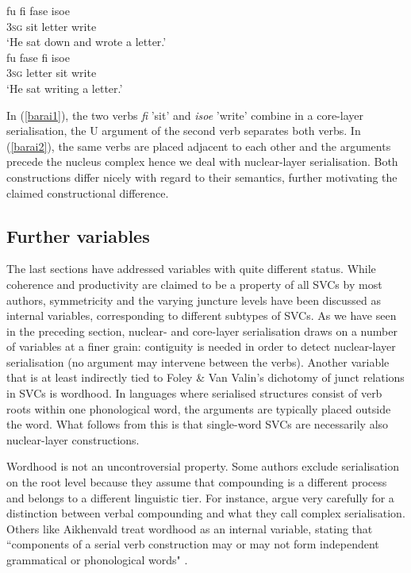 \ea 
{}
\ea \label{barai1}
\gll fu fi fase isoe \\
\textsc{3}\textsc{sg} sit letter write \\
\glft `He sat down and wrote a letter.' \\ 
\ex \label{barai2}
\gll fu fase fi isoe \\ 
\textsc{3}\textsc{sg} letter sit write \\
\glft `He sat writing a letter.'\\ 
\z
\z

In (\ref{barai1}), the two verbs \textit{fi} 'sit' and \textit{isoe} 'write' combine in a core-layer serialisation, the U argument of the second verb separates both verbs. In (\ref{barai2}), the same verbs are placed adjacent to each other and the arguments precede the nucleus complex hence we deal with nuclear-layer serialisation. Both constructions differ nicely with regard to their semantics, further motivating the claimed constructional difference.

\subsection{Further variables}

The last sections have addressed variables with quite different status. While coherence and productivity are claimed to be a property of all SVCs by most authors, symmetricity and the varying juncture levels have been discussed as internal variables, corresponding to different subtypes of SVCs. As we have seen in the preceding section, nuclear- and core-layer serialisation draws on a number of variables at a finer grain: contiguity is needed in order to detect nuclear-layer serialisation (no argument may intervene between the verbs). Another variable that is at least indirectly tied to Foley \& Van Valin's dichotomy of junct relations in SVCs is wordhood. In languages where serialised structures consist of verb roots within one phonological word, the arguments are typically placed outside the word. What follows from this is that single-word SVCs are necessarily also nuclear-layer constructions. 

Wordhood is not an uncontroversial property. Some authors exclude serialisation on the root level because they assume that compounding is a different process and belongs to a different linguistic tier. For instance, \citet[27]{vanstaden2008serial} argue very carefully for a distinction between verbal compounding and what they call complex serialisation. Others like Aikhenvald treat wordhood as an internal variable, stating that ``components of a serial verb construction may or may not form independent grammatical or phonological words" \citep[3]{Aikhenvald2006}.

